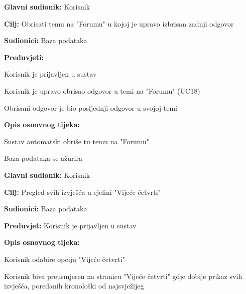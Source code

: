 					\noindent {}
                    \begin{packed_item}
    
                        \item \textbf{Glavni sudionik: }Korisnik
                        \item  \textbf{Cilj:} Obrisati temu na "Forumu" u kojoj je upravo izbrisan zadnji odgovor
                        \item  \textbf{Sudionici:} Baza podataka
                        \item  \textbf{Preduvjeti:}
						\item[] \begin{packed_enum}
							\item Korisnik je prijavljen u sustav
							\item Korisnik je upravo obrisao odgovor u temi na "Forumu" (UC18)
							\item Obrisani odgovor je bio posljednji odgovor u svojoj temi
						\end{packed_enum}
                        \item  \textbf{Opis osnovnog tijeka:}
                        
                        \item[] \begin{packed_enum}
    
                            \item Sustav automatski obriše tu temu na "Forumu"
                            \item Baza podataka se ažurira
                        \end{packed_enum}
                    \end{packed_item}
					
										
					\noindent {}
					\begin{packed_item}
	
						\item \textbf{Glavni sudionik: }Korisnik
						\item  \textbf{Cilj:} Pregled svih izvješća u cjelini "Vijeće četvrti"
						\item  \textbf{Sudionici:} Baza podataka
						\item  \textbf{Preduvjet:} Korisnik je prijavljen u sustav
						\item  \textbf{Opis osnovnog tijeka:}
						
						\item[] \begin{packed_enum}
	
							\item Korisnik odabire opciju "Vijeće četvrti" 
							\item Korisnik biva preusmjeren na stranicu "Vijeće četvrti" gdje dobije prikaz svih izvješća, poredanih kronološki od najsvježijeg
							
							
						\end{packed_enum}

						
					\end{packed_item}		
					

